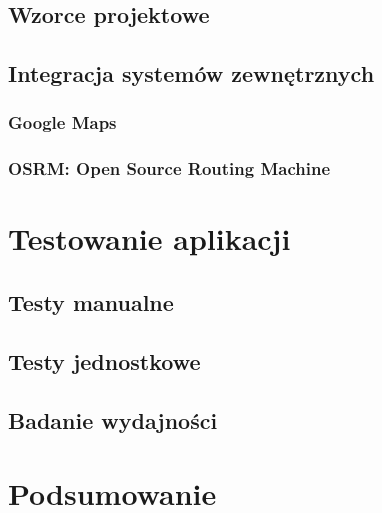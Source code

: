 \documentclass[12pt,a4paper]{report}
\begin{document}
		\section{Wzorce projektowe}
			
		\section{Integracja systemów zewnętrznych}
			
			\subsection{Google Maps}
				
			\subsection{OSRM: Open Source Routing Machine}
				
	\chapter{Testowanie aplikacji}
	\section{Testy manualne}
		
	\section{Testy jednostkowe}
		\label{sec:testy_jednostkowe}
		
	\section{Badanie wydajności}\label{sec:wydajnosc}
%		
	\chapter*{Podsumowanie}
		
	
	
\end{document}
